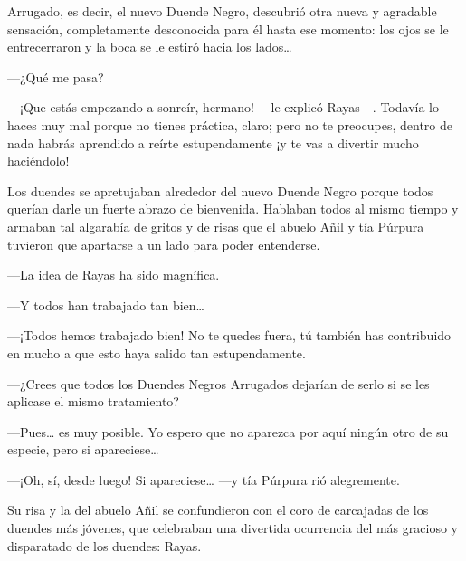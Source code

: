 \documentclass{barcodevapor3pags}
\begin{document}
Arrugado, es decir, el nuevo Duende Negro, descubrió otra nueva y
agradable sensación, completamente desconocida para él hasta ese
momento: los ojos se le entrecerraron y la boca se le estiró hacia los
lados\ldots{}

---¿Qué me pasa?

---¡Que estás empezando a sonreír, hermano! ---le explicó Rayas---.
Todavía lo haces muy mal porque no tienes práctica, claro; pero no te
preocupes, dentro de nada habrás aprendido a reírte estupendamente ¡y te
vas a divertir mucho haciéndolo!

Los duendes se apretujaban alrededor del nuevo Duende Negro porque todos
querían darle un fuerte abrazo de bienvenida. Hablaban todos al mismo
tiempo y armaban tal algarabía de gritos y de risas que el abuelo Añil y
tía Púrpura tuvieron que apartarse a un lado para poder entenderse.

---La idea de Rayas ha sido magnífica.

---Y todos han trabajado tan bien\ldots{}

---¡Todos hemos trabajado bien! No te quedes fuera, tú también has
contribuido en mucho a que esto haya salido tan estupendamente.

---¿Crees que todos los Duendes Negros Arrugados dejarían de serlo si se
les aplicase el mismo tratamiento?

---Pues\ldots{} es muy posible. Yo espero que no aparezca por aquí
ningún otro de su especie, pero si apareciese\ldots{}

---¡Oh, sí, desde luego! Si apareciese\ldots{} ---y tía Púrpura rió
alegremente.

Su risa y la del abuelo Añil se confundieron con el coro de carcajadas
de los duendes más jóvenes, que celebraban una divertida ocurrencia del
más gracioso y disparatado de los duendes: Rayas.
\end{document}
